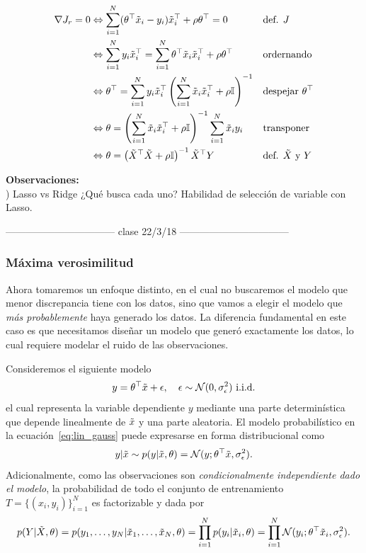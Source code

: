 \begin{align}
\nabla J_r=0 &\Leftrightarrow \sum_{i=1}^N(\theta^\top \tilde{x}_i - y_i)\tilde{x}_i^\top + \rho\theta^\top=0  							&&\text{def. $J$}\\  
&\Leftrightarrow \sum_{i=1}^Ny_i\tilde{x}_i^\top = \sum_{i=1}^N\theta^\top \tilde{x}_i\tilde{x}_i^\top + \rho\theta^\top					&&\text{ordernando}\\
&\Leftrightarrow \theta^\top = \sum_{i=1}^Ny_i\tilde{x}_i^\top \left(\sum_{i=1}^N \tilde{x}_i\tilde{x}_i^\top + \rho {\mathbb I}\right)^{-1}	&&\text{despejar $\theta^\top$}\\
&\Leftrightarrow \theta =  \left(\sum_{i=1}^N \tilde{x}_i\tilde{x}_i^\top +\rho {\mathbb I}\right)^{-1} \sum_{i=1}^N \tilde{x}_i y_i 		&&\text{transponer}\\
&\Leftrightarrow \theta = \left(\tilde{X}^\top\tilde{X} +\rho {\mathbb I}\right)^{-1} \tilde{X}^\top Y 											&&\text{def. $\tilde{X}$ y $Y$}
\end{align}

\noindent\textbf{Observaciones:}\\

) Lasso vs Ridge ¿Qué busca cada uno? Habilidad de selección de variable con Lasso. \\



\centerline{--------------------------------- clase 22/3/18 ---------------------------------}


\subsubsection{Máxima verosimilitud} %
\label{ssub:max_ver}

Ahora tomaremos un enfoque distinto, en el cual no buscaremos el modelo que menor discrepancia tiene con los datos, sino que vamos a elegir el modelo que \emph{más probablemente} haya generado los datos. La diferencia fundamental en este caso es que necesitamos diseñar un modelo que generó exactamente los datos, lo cual requiere modelar el ruido de las observaciones. 

Consideremos el siguiente modelo
\begin{equation}
	y = \theta^\top\tx + \epsilon,\quad \epsilon\sim\cN(0,\sigma_\epsilon^2) \ \text{i.i.d.} 
	\label{eq:lin_gauss}
\end{equation}
el cual representa la variable dependiente $y$ mediante una parte determinística que depende linealmente de $\tilde{x}$ y una parte aleatoria. El modelo probabilístico en la ecuación~\eqref{eq:lin_gauss} puede expresarse en forma distribucional como 
\begin{equation}
	y|\tilde{x} \sim p(y|\tilde{x},\theta) = {\mathcal N}(y;\theta^\top\tilde{x},\sigma_\epsilon^2).
\end{equation}
Adicionalmente, como las observaciones son \emph{condicionalmente independiente dado el modelo}, la probabilidad de todo el conjunto de entrenamiento $T=\{(x_i,y_i)\}_{i=1}^N$ es factorizable y dada por
\begin{equation}
	p(Y|\tilde{X},\theta) = p(y_1,\ldots,y_N|\tilde{x}_1,\ldots,\tilde{x}_N,\theta)= \prod_{i=1}^Np(y_i|\tilde{x}_i,\theta) = \prod_{i=1}^N {\mathcal N}(y_i;\theta^\top\tilde{x}_i,\sigma_\epsilon^2).
\end{equation}

